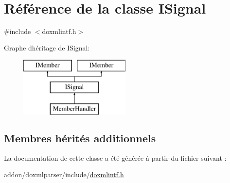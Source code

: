 \hypertarget{class_i_signal}{}\section{Référence de la classe I\+Signal}
\label{class_i_signal}


{\ttfamily \#include $<$doxmlintf.\+h$>$}

Graphe d\textquotesingle{}héritage de I\+Signal\+:\begin{figure}[H]
\begin{center}
\leavevmode
\includegraphics[height=3.000000cm]{class_i_signal}
\end{center}
\end{figure}
\subsection*{Membres hérités additionnels}


La documentation de cette classe a été générée à partir du fichier suivant \+:\begin{DoxyCompactItemize}
\item 
addon/doxmlparser/include/\hyperlink{include_2doxmlintf_8h}{doxmlintf.\+h}\end{DoxyCompactItemize}
